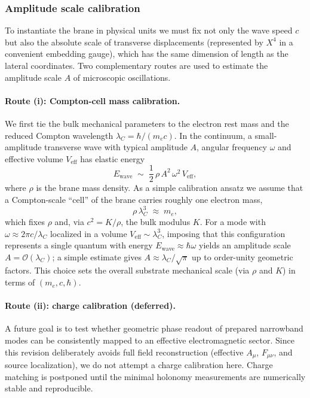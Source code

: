 \subsubsection{Amplitude scale calibration}\label{amplitude-scale-calibration}

To instantiate the brane in physical units we must fix not only the wave speed
$c$ but also the absolute scale of transverse displacements (represented by $X^4$ in a convenient embedding gauge), which has the
same dimension of length as the lateral coordinates. Two complementary routes
are used to estimate the amplitude scale $A$ of microscopic oscillations.

\paragraph{Route (i): Compton-cell mass calibration.}
We first tie the bulk mechanical parameters to the electron rest mass and the
reduced Compton wavelength
$\lambda_C = \hbar/(m_e c)$. In the continuum, a small-amplitude transverse wave
with typical amplitude $A$, angular frequency $\omega$ and effective volume
$V_{\text{eff}}$ has elastic energy
\begin{equation}
  E_{\text{wave}} \;\sim\; \frac{1}{2}\,\rho\,A^2\,\omega^2\,V_{\text{eff}},
  \label{eq:wave-energy-amplitude}
\end{equation}
where $\rho$ is the brane mass density. As a simple calibration ansatz we assume
that a Compton-scale ``cell'' of the brane carries roughly one electron mass,
\begin{equation}
  \rho\,\lambda_C^3 \;\approx\; m_e,
\end{equation}
which fixes $\rho$ and, via $c^2 = K/\rho$, the bulk modulus $K$. For a mode
with $\omega \approx 2\pi c/\lambda_C$ localized in a volume
$V_{\text{eff}}\sim\lambda_C^3$, imposing that this configuration represents
a single quantum with energy $E_{\text{wave}}\approx\hbar\omega$ yields an
amplitude scale $A=\mathcal{O}(\lambda_C)$; a simple estimate gives
$A \approx \lambda_C/\sqrt{\pi}$ up to order-unity geometric factors. This
choice sets the overall substrate mechanical scale (via $\rho$ and $K$) in terms
of $(m_e,c,\hbar)$.

\paragraph{Route (ii): charge calibration (deferred).}
A future goal is to test whether geometric phase readout of prepared narrowband modes can be
consistently mapped to an effective electromagnetic sector. Since this revision deliberately
avoids full field reconstruction (effective $A_\mu$, $F_{\mu\nu}$, and source localization),
we do not attempt a charge calibration here. Charge matching is postponed until the minimal
holonomy measurements are numerically stable and reproducible.

